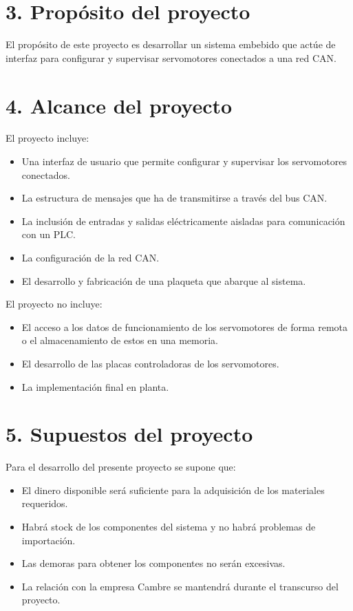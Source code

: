 \documentclass[
11pt, %
]{charter}
\begin{document}
\section{3. Propósito del proyecto}
\label{sec:proposito}

El propósito de este proyecto es desarrollar un sistema embebido que actúe de interfaz para configurar y supervisar servomotores conectados a una red CAN.

\section{4. Alcance del proyecto}
\label{sec:alcance}

El proyecto incluye:

\begin{itemize}
	\item Una interfaz de usuario que permite configurar y supervisar los servomotores conectados.
	\item La estructura de mensajes que ha de transmitirse a través del bus CAN.
	\item La inclusión de entradas y salidas eléctricamente aisladas para comunicación con un PLC.
	\item La configuración de la red CAN.
	\item El desarrollo y fabricación de una plaqueta que abarque al sistema.
\end{itemize}

El proyecto no incluye:

\begin{itemize}
	\item El acceso a los datos de funcionamiento de los servomotores de forma remota o el almacenamiento de estos en una memoria.
	\item El desarrollo de las placas controladoras de los servomotores.
	\item La implementación final en planta.
\end{itemize}

\section{5. Supuestos del proyecto}
\label{sec:supuestos}

Para el desarrollo del presente proyecto se supone que:

\begin{itemize}
	\item El dinero disponible será suficiente para la adquisición de los materiales requeridos.
	\item Habrá stock de los componentes del sistema y no habrá problemas de importación. 
	\item Las demoras para obtener los componentes no serán excesivas.
	\item La relación con la empresa Cambre se mantendrá durante el transcurso del proyecto.
\end{itemize}
\end{document}
